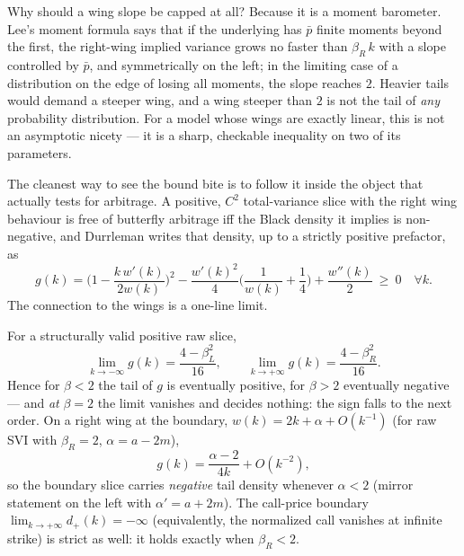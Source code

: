 \documentclass[11pt]{article}
\newcommand{\betL}{\beta_L}
\newcommand{\betR}{\beta_R}
\begin{document}
Why should a wing slope be capped at all?  Because it is a moment barometer.
Lee's moment formula \cite{Lee2004} says that if the underlying has $\bar p$
finite moments beyond the first, the right-wing implied variance grows no faster
than $\betR\,k$ with a slope controlled by $\bar p$, and symmetrically on the
left; in the limiting case of a distribution on the edge of losing all moments,
the slope reaches $2$.  Heavier tails would demand a steeper wing, and a wing
steeper than $2$ is not the tail of \emph{any} probability distribution.  For a
model whose wings are exactly linear, this is not an asymptotic nicety --- it is
a sharp, checkable inequality on two of its parameters.

The cleanest way to see the bound bite is to follow it inside the object that
actually tests for arbitrage.  A positive, $C^2$ total-variance slice with the
right wing behaviour is free of butterfly arbitrage iff the Black density it
implies is non-negative, and Durrleman \cite{Durrleman2010} writes that density,
up to a strictly positive prefactor, as
\begin{equation}
g(k)=\Big(1-\frac{k\,w'(k)}{2w(k)}\Big)^2
-\frac{w'(k)^2}{4}\Big(\frac{1}{w(k)}+\frac14\Big)+\frac{w''(k)}{2}\ \ge\ 0
\quad\forall k .
\label{eq:g}
\end{equation}
The connection to the wings is a one-line limit.

\begin{proposition}
\label{prop:tail}
For a structurally valid positive raw slice,
\begin{equation}
\lim_{k\to-\infty}g(k)=\frac{4-\betL^2}{16},\qquad
\lim_{k\to+\infty}g(k)=\frac{4-\betR^2}{16}.
\label{eq:gtail}
\end{equation}
Hence for $\beta<2$ the tail of $g$ is eventually positive, for $\beta>2$
eventually negative --- and \emph{at} $\beta=2$ the limit vanishes and decides
nothing: the sign falls to the next order.  On a right wing at the boundary,
$w(k)=2k+\alpha+O(k^{-1})$ (for raw SVI with $\betR=2$, $\alpha=a-2m$),
\begin{equation}
g(k)=\frac{\alpha-2}{4k}+O(k^{-2}),
\label{eq:gboundary}
\end{equation}
so the boundary slice carries \emph{negative} tail density whenever
$\alpha<2$ (mirror statement on the left with $\alpha'=a+2m$).  The
call-price boundary $\lim_{k\to+\infty}d_+(k)=-\infty$ (equivalently, the
normalized call vanishes at infinite strike) is strict as well: it holds
exactly when $\betR<2$.
\end{proposition}
\end{document}
